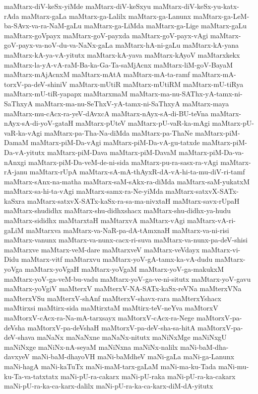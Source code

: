 {maMtarx-diV-keSx-yiMde
maMtarx-diV-keSxyu
maMtarx-diV-keSx-yu-katx-rAda
maMtarx-gaLa
maMtarx-ga-Lalilx
maMtarx-ga-Lanunx
maMtarx-ga-LeM-ba-SAvx-va-ra-NaM-gaLu
maMtarx-ga-LiMda
maMtarx-ga-Lige
maMtarx-gaLu
maMtarx-goVpayx
maMtarx-goV-payxda
maMtarx-goV-payx-vAgi
maMtarx-goV-payx-va-noV-du-va-NaNx-gaLa
maMtarx-hA-ni-gaLu
maMtarx-kA-yana
maMtarx-kA-ya-vA-yitutx
maMtarx-kA-yava
maMtarx-kAyoV
maMtarxkekx
maMtarx-la-yA-vA-raM-Ba-ka-Ga-Ta-saMjAcnx
maMtarx-liM-goV-BayaM
maMtarx-mAjAcnxM
maMtarx-mAtA
maMtarx-mA-ta-ramf
maMtarx-mA-torxV-pa-deV-shiniV
maMtarx-mUtiR
maMtarx-mUtiRM
maMtarx-mU-tiRya
maMtarx-mU-tiR-yapapx
maMtarxmaM
maMtarx-ma-nu-SAThx-yA-tamx-ni-SaThxyA
maMtarx-ma-nu-SeThxV-yA-tamx-ni-SaThxyA
maMtarx-maya
maMtarx-mu-cAcx-ra-yeV-dAvxcA
maMtarx-nAyx-sA-di-BU-teVna
maMtarx-nAyx-sA-di-yoV-gataH
maMtarx-pUteV
maMtarx-pU-vaR-ka-mAgi
maMtarx-pU-vaR-ka-vAgi
maMtarx-pa-Tha-Na-diMda
maMtarx-pa-ThaNe
maMtarx-piM-DamaM
maMtarx-piM-Da-vAgi
maMtarx-piM-Da-vA-gu-tatxde
maMtarx-piM-Da-vA-yitutx
maMtarx-piM-Dava
maMtarx-piM-DavaM
maMtarx-piM-Da-va-nAnxgi
maMtarx-piM-Da-veM-de-ni-sida
maMtarx-pu-ra-sasx-ra-vAgi
maMtarx-rA-janu
maMtarx-rUpA
maMtarx-sA-mA-thAyxR-dA-vA-hi-ta-mu-diV-ri-tamf
maMtarx-sAnx-na-matha
maMtarx-saM-sAkx-ra-diMda
maMtarx-saM-yukatxM
maMtarx-sa-hi-ta-vAgi
maMtarx-samx-ra-Ne-yiMda
maMtarx-satxvX-SATx-kaSxra
maMtarx-satxvX-SATx-kaSx-ra-sa-ma-nivxtaH
maMtarx-savx-rUpaH
maMtarx-shudidhx
maMtarx-shu-didhxshacx
maMtarx-shu-didhx-ya-hudu
maMtarx-sididhx
maMtarxtaH
maMtarxvA
maMtarx-vAgi
maMtarx-vA-ri-gaLiM
maMtarxva
maMtarx-va-NaR-pa-dA-tAmxnaH
maMtarx-va-ni-risi
maMtarx-vanunx
maMtarx-va-nunx-cacx-ri-suva
maMtarx-va-nunx-pa-deV-shisi
maMtarxve
maMtarx-veM-dare
maMtarxveV
maMtarx-veVdayx
maMtarx-vi-Didu
maMtarx-vitf
maMtarxvu
maMtarx-yoV-gA-tamx-ka-vA-dudu
maMtarx-yoVga
maMtarx-yoVgaH
maMtarx-yoVgaM
maMtarx-yoV-ga-makukxM
maMtarx-yoV-ga-veM-bu-vadu
maMtarx-yoV-ga-ve-ni-situtx
maMtarx-yoV-gavu
maMtarx-yoVgiV
maMterxV
maMterxV-NA-SATx-kaSx-reVNa
maMterxVNa
maMterxVSu
maMterxV-shAnf
maMterxV-shavx-rara
maMterxYshacx
maMtirxsi
maMtirx-sida
maMtirxtaM
maMtirx-teV-neYva
maMtorxV
maMtorxV-cAcx-ra-Na-mA-tarxsayx
maMtorxV-cAcx-ra-Nege
maMtorxV-pa-deVsha
maMtorxV-pa-deVshaH
maMtorxV-pa-deV-sha-sa-hitA
maMtorxV-pa-deV-shava
maNaNx
maNaNxne
maNaNx-nitutx
maNiNxMge
maNiNxgU
maNiNxge
maNiNx-nA-seyaM
maNiNxna
maNiNx-nalilx
maNi-baM-dha-davxyeV
maNi-baM-dhayoVH
maNi-baMdheV
maNi-gaLa
maNi-ga-Lanunx
maNi-hagA
maNi-kaTuTx
maNi-maM-tarx-gaLaM
maNi-ma-ku-Tada
maNi-mu-ku-Ta-va-tatxtatx
maNi-pU-ra-cakarx
maNi-pU-raka
maNi-pU-ra-ka-cakarx
maNi-pU-ra-ka-ca-karx-dalilx
maNi-pU-ra-ka-ca-karx-diM-dA-yitutx
}
